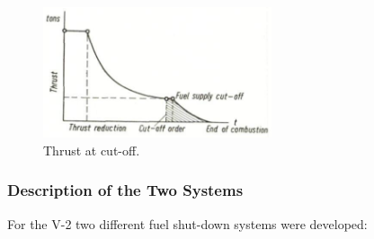 \documentclass[12pt, a4paper]{article}
\begin{document}
\begin{figure}[ht]
  \centering
  \includegraphics[width=0.6\textwidth]{figs/ctrl-07.png}
  \caption{Thrust at cut-off.}
  \label{fig:07}
\end{figure}

\subsubsection{Description of the Two Systems}

For the V-2 two different fuel shut-down systems were developed:
\end{document}
